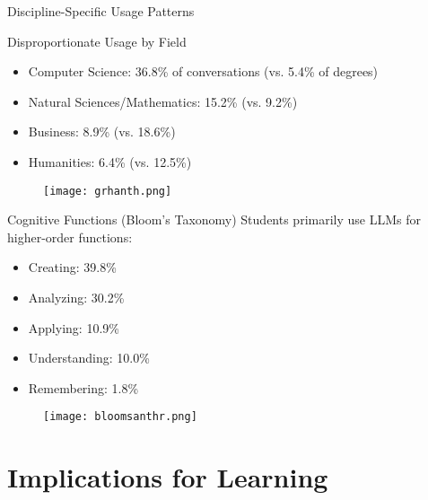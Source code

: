 \documentclass{beamer}
\begin{document}
\begin{frame}{Discipline-Specific Usage Patterns}
\begin{block}{Disproportionate Usage by Field}
\begin{itemize}
  \item Computer Science: 36.8\% of conversations (vs. 5.4\% of degrees)
  \item Natural Sciences/Mathematics: 15.2\% (vs. 9.2\%)
  \item Business: 8.9\% (vs. 18.6\%)
  \item Humanities: 6.4\% (vs. 12.5\%)
\end{itemize}
\end{block}
\begin{figure}
    \centering
    \texttt{[image: grhanth.png]}
\end{figure}
\end{frame}
\begin{frame}
\begin{block}{Cognitive Functions (Bloom's Taxonomy)}
Students primarily use LLMs for higher-order functions:
\begin{itemize}
  \item Creating: 39.8\%
  \item Analyzing: 30.2\%
  \item Applying: 10.9\%
  \item Understanding: 10.0\%
  \item Remembering: 1.8\%
\end{itemize}
\end{block}

\begin{figure}
    \centering
    \texttt{[image: bloomsanthr.png]}
\end{figure}
\end{frame}





\section{Implications for Learning}
\end{document}
